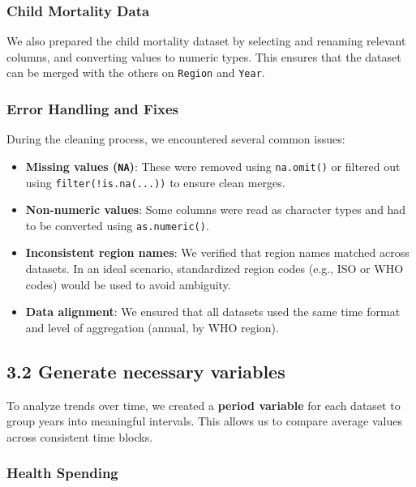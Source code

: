 \documentclass[
]{article}
\providecommand{\tightlist}{%
  \setlength{\itemsep}{0pt}\setlength{\parskip}{0pt}}
\begin{document}
\subsubsection{Child Mortality Data}\label{child-mortality-data}

We also prepared the child mortality dataset by selecting and renaming
relevant columns, and converting values to numeric types. This ensures
that the dataset can be merged with the others on \texttt{Region} and
\texttt{Year}.

\subsubsection{Error Handling and Fixes}\label{error-handling-and-fixes}

During the cleaning process, we encountered several common issues:

\begin{itemize}
\tightlist
\item
  \textbf{Missing values (\texttt{NA})}: These were removed using
  \texttt{na.omit()} or filtered out using \texttt{filter(!is.na(...))}
  to ensure clean merges.
\item
  \textbf{Non-numeric values}: Some columns were read as character types
  and had to be converted using \texttt{as.numeric()}.
\item
  \textbf{Inconsistent region names}: We verified that region names
  matched across datasets. In an ideal scenario, standardized region
  codes (e.g., ISO or WHO codes) would be used to avoid ambiguity.
\item
  \textbf{Data alignment}: We ensured that all datasets used the same
  time format and level of aggregation (annual, by WHO region).
\end{itemize}

\subsection{3.2 Generate necessary
variables}\label{generate-necessary-variables}

To analyze trends over time, we created a \textbf{period variable} for
each dataset to group years into meaningful intervals. This allows us to
compare average values across consistent time blocks.

\subsubsection{Health Spending}\label{health-spending}
\end{document}
